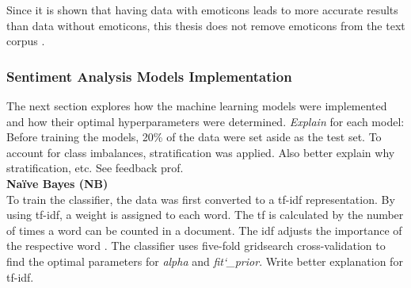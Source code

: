 \documentclass[11pt, a4paper]{article}
\begin{document}
Since it is shown that having data with emoticons leads to more accurate results than data without emoticons,
this thesis does not remove emoticons from the text corpus \citep{parveen2016sentimentanalysistwitter}.

\subsubsection{Sentiment Analysis Models Implementation}
The next section explores how the machine learning models were implemented and how their optimal hyperparameters were determined.
\emph{Explain} for each model: Before training the models, 20\% of the data were set aside as the test set. To account for class imbalances, stratification was applied.
Also better explain why stratification, etc. See feedback prof.\\

\noindent\textbf{Naïve Bayes (NB)}\\
To train the classifier, the data was first converted to a tf-idf representation. By using tf-idf, a weight is
assigned to each word. The tf is calculated by the number of times a word can be counted in a document. The idf adjusts the importance of the respective word \citep{Guia2019ComparisonON}.
The classifier uses five-fold gridsearch cross-validation to find the optimal parameters for \emph{alpha} and \emph{fit\char`_prior}.
Write better explanation for tf-idf. \\
\end{document}
